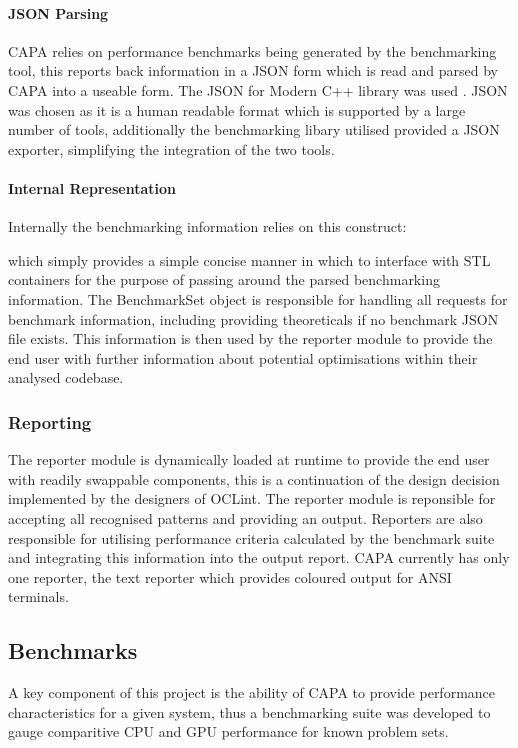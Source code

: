 \paragraph{JSON Parsing}
CAPA relies on performance benchmarks being generated by the benchmarking tool, this reports back
information in a JSON form which is read and parsed by CAPA into a useable form. The JSON for Modern
C++ library was used \cite{JSON}. JSON was chosen as it is a human readable format which is
supported by a large number of tools, additionally the benchmarking libary utilised provided a JSON
exporter, simplifying the integration of the two tools.

\paragraph{Internal Representation}
Internally the benchmarking information relies on this construct:

which simply provides a simple concise manner in which to interface with STL containers for the
purpose of passing around the parsed benchmarking information. The BenchmarkSet object is
responsible for handling all requests for benchmark information, including providing theoreticals if
no benchmark JSON file exists. This information is then used by the reporter module to provide the
end user with further information about potential optimisations within their analysed codebase.

\subsubsection{Reporting}
The reporter module is dynamically loaded at runtime to provide the end user with readily swappable
components, this is a continuation of the design decision implemented by the designers of OCLint.
The reporter module is reponsible for accepting all recognised patterns and providing an output.
Reporters are also responsible for utilising performance criteria calculated by the benchmark suite
and integrating this information into the output report. CAPA currently has only one reporter, the
text reporter which provides coloured output for ANSI terminals.

\subsection{Benchmarks}
A key component of this project is the ability of CAPA to provide performance characteristics for a
given system, thus a benchmarking suite was developed to gauge comparitive CPU and GPU performance
for known problem sets.

